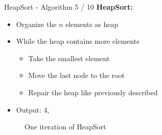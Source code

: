 \documentclass[notes=hide,pdftex,14pt]{beamer}
\newcommand{\currentred}{red!70!gray}
\begin{document}
\begin{frame}{HeapSort - Algorithm 5 / 10}
  \textbf{HeapSort:}
  \begin{itemize}
    \item
      Organize the {\color{Mittel-Blau}$n$} elements as heap
    \item
      While the heap contains more elements
      \begin{itemize}
        \item
          Take the smallest element
        \item
          Move the last node to the root
        \item
          Repair the heap like previously described
      \end{itemize}
    \item
      Output: {\color{Greenb}4}, 
  \end{itemize}
  \vspace*{-0.5em}
  \begin{center}
   \begin{figure}[!h]%
      \begin{columns}%
        \begin{column}{0.3\textwidth}%
          \begin{centering}
            \begin{adjustbox}{height=8em}
              \hspace*{-2.5em} %
            \end{adjustbox}%
          \end{centering}
        \end{column}%
        \begin{column}{0.3\textwidth}%
          \begin{centering}
            \begin{adjustbox}{height=8em}
       \hspace*{-0.75em}%
\rlap{\onslide<3>{\renewcommand{\currentred}{Mittel-Blau}}}%
%
            \end{adjustbox}%
          \end{centering}
        \end{column}%
        \begin{column}{0.3\textwidth}%
          \begin{centering}
            \begin{adjustbox}{height=8em}
            \end{adjustbox}%
          \end{centering}
        \end{column}%
      \end{columns}%
      \caption{One iteration of HeapSort}%
      \label{fig:heapsort_repair}%
    \end{figure}
  \end{center}
\end{frame}
\end{document}
